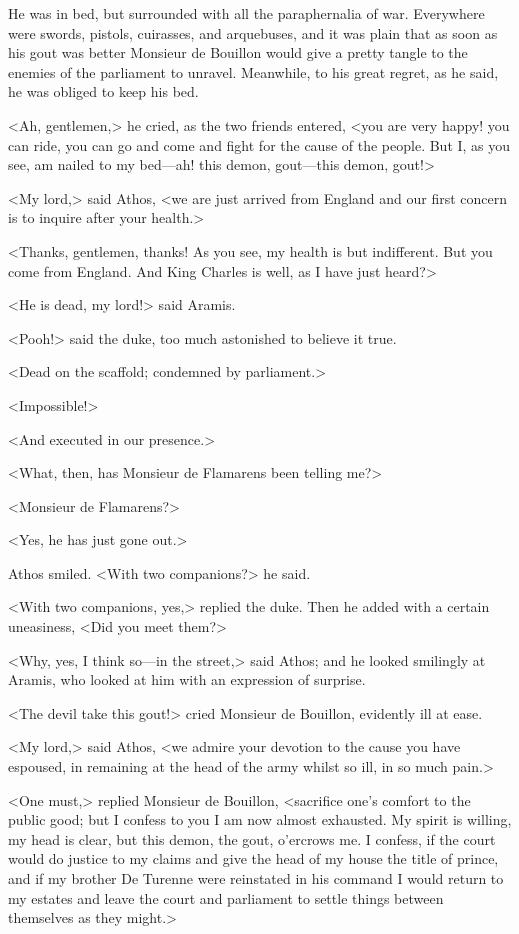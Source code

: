 He was in bed, but surrounded with all the paraphernalia of war. Everywhere were swords, pistols, cuirasses, and arquebuses, and it was plain that as soon as his gout was better Monsieur de Bouillon would give a pretty tangle to the enemies of the parliament to unravel. Meanwhile, to his great regret, as he said, he was obliged to keep his bed.

<Ah, gentlemen,> he cried, as the two friends entered, <you are very happy! you can ride, you can go and come and fight for the cause of the people. But I, as you see, am nailed to my bed—ah! this demon, gout—this demon, gout!>

<My lord,> said Athos, <we are just arrived from England and our first concern is to inquire after your health.>

<Thanks, gentlemen, thanks! As you see, my health is but indifferent. But you come from England. And King Charles is well, as I have just heard?>

<He is dead, my lord!> said Aramis.

<Pooh!> said the duke, too much astonished to believe it true.

<Dead on the scaffold; condemned by parliament.>

<Impossible!>

<And executed in our presence.>

<What, then, has Monsieur de Flamarens been telling me?>

<Monsieur de Flamarens?>

<Yes, he has just gone out.>

Athos smiled. <With two companions?> he said.

<With two companions, yes,> replied the duke. Then he added with a certain uneasiness, <Did you meet them?>

<Why, yes, I think so—in the street,> said Athos; and he looked smilingly at Aramis, who looked at him with an expression of surprise.

<The devil take this gout!> cried Monsieur de Bouillon, evidently ill at ease.

<My lord,> said Athos, <we admire your devotion to the cause you have espoused, in remaining at the head of the army whilst so ill, in so much pain.>

<One must,> replied Monsieur de Bouillon, <sacrifice one's comfort to the public good; but I confess to you I am now almost exhausted. My spirit is willing, my head is clear, but this demon, the gout, o'ercrows me. I confess, if the court would do justice to my claims and give the head of my house the title of prince, and if my brother De Turenne were reinstated in his command I would return to my estates and leave the court and parliament to settle things between themselves as they might.>

